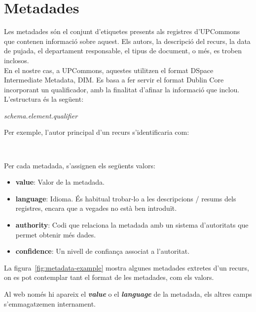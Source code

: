 \section{Metadades}\label{sec:metadata-processing}

Les metadades són el conjunt d'etiquetes presents als registres d'\gls{UPCommons} que contenen informació sobre aquest.
Els autors, la descripció del recurs, la data de pujada, el departament responsable, el tipus de document, o més, es troben inclosos. \\

\noindent
En el nostre cas, a \gls{UPCommons}, aquestes utilitzen el format \gls{DSpace} Intermediate Metadata, \gls{DIM}.
Es basa a fer servir el format \gls{Dublin Core} incorporant un qualificador, amb la finalitat d'afinar la informació que inclou.
L'estructura és la següent:

\begin{center}
    \textit{schema.element.qualifier} \\
\end{center}

\noindent
Per exemple, l'autor principal d'un recurs s'identificaria com:

\begin{center}
     \\
\end{center}

\noindent
Per cada metadada, s'assignen els següents valors:

\begin{itemize}
    \item \textbf{value}: Valor de la metadada.
    \item \textbf{language}: Idioma.
    És habitual trobar-lo a les descripcions / resums dels registres, encara que a vegades no està ben introduït.
    \item \textbf{authority}: Codi que relaciona la metadada amb un sistema d'autoritats que permet obtenir més dades.
    \item \textbf{confidence}: Un nivell de confiança associat a l'autoritat.
\end{itemize}

\clearpage

\noindent
La figura~\ref{fig:metadata-example} mostra algunes metadades extretes d'un recurs, on es pot contemplar tant el format de les metadades, com els valors. \\

\begin{tcolorbox}[colback=green!5!white, colframe=green!50!black, title=Metadades]
    Al web només hi apareix el \textbf{\textit{value}} o el \textbf{\textit{language}} de la metadada, els altres camps s'emmagatzemen internament.
\end{tcolorbox}

